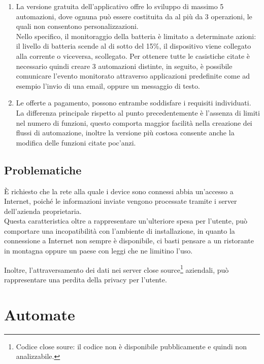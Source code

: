 \documentclass[target=bach]{thud}
\begin{document}
    \begin{enumerate}
        \item La versione gratuita dell'applicativo offre lo sviluppo di massimo 5 automazioni, dove ognuna può essere costituita da al più da 3 operazioni, le quali non consentono personalizzazioni.\\
        Nello specifico, il monitoraggio della batteria è limitato a determinate azioni: il livello di batteria scende al di sotto del 15\%, il dispositivo viene collegato alla corrente o viceversa, scollegato.
        Per ottenere tutte le casistiche citate è necessario quindi creare 3 automazioni distinte, in seguito, è possibile comunicare l'evento monitorato attraverso applicazioni predefinite come ad esempio l'invio di una email, oppure un messaggio di testo.
        \item Le offerte a pagamento, possono entrambe soddisfare i requisiti individuati.
        La differenza principale rispetto al punto precedentemente è l'assenza di limiti nel numero di funzioni, questo comporta maggior facilità nella creazione dei flussi di automazione, inoltre la versione più costosa consente anche la modifica delle funzioni citate poc'anzi.
    \end{enumerate}

    \subsection{Problematiche}

    \`E richiesto che la rete alla quale i device sono connessi abbia un'accesso a Internet, poiché le informazioni inviate vengono processate tramite i server dell'azienda proprietaria.\\
    Questa caratteristica oltre a rappresentare un'ulteriore spesa per l'utente, può comportare una incopatibilità con l'ambiente di installazione, in quanto la connessione a Internet non sempre è disponibile, ci basti pensare a un ristorante in montagna oppure un paese con leggi che ne limitino l'uso.

    Inoltre, l'attraversamento dei dati nei server close source\footnote[1]{Codice close soure: il codice non è disponibile pubblicamente e quindi non analizzabile.} aziendali, può rappresentare una perdita della privacy per l'utente.


    \section{Automate}
\end{document}
